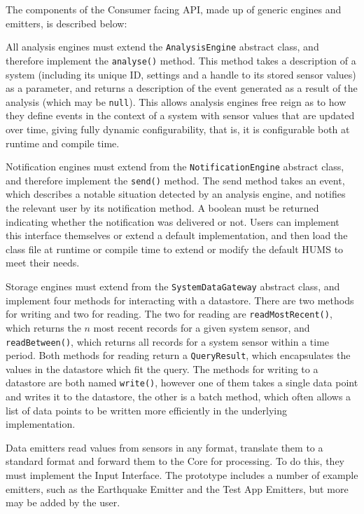 \documentclass[10pt,a4paper]{article}
\begin{document}
The components of the Consumer facing API, made up of generic engines and emitters, is described below:
\begin{description} [noitemsep]	
	\item[Analysis Engines] All analysis engines must extend the \texttt{AnalysisEngine} abstract class, and therefore implement the \texttt{analyse()} method. This method takes a description of a system (including its unique ID, settings and a handle to its stored sensor values) as a parameter, and returns a description of the event generated as a result of the analysis (which may be \texttt{null}). This allows analysis engines free reign as to how they define events in the context of a system with sensor values that are updated over time, giving fully dynamic configurability, that is, it is configurable both at runtime and compile time.
	\item[Notification Engines] Notification engines must extend from the \texttt{NotificationEngine} abstract class, and therefore implement the \texttt{send()} method. The send method takes an event, which describes a notable situation detected by an analysis engine, and notifies the relevant user by its notification method. A boolean must be returned indicating whether the notification was delivered or not. Users can implement this interface themselves or extend a default implementation, and then load the class file at runtime or compile time to extend or modify the default HUMS to meet their needs.
	\item[Storage Engines] Storage engines must extend from the \texttt{SystemDataGateway} abstract class, and implement four methods for interacting with a datastore. There are two methods for writing and two for reading. The two for reading are \texttt{readMostRecent()}, which returns the $n$ most recent records for a given system sensor, and \texttt{readBetween()}, which returns all records for a system sensor within a time period. Both methods for reading return a \texttt{QueryResult}, which encapsulates the values in the datastore which fit the query. The methods for writing to a datastore are both named \texttt{write()}, however one of them takes a single data point and writes it to the datastore, the other is a batch method, which often allows a list of data points to be written more efficiently in the underlying implementation.
	\item[Data Emitters] Data emitters read values from sensors in any format, translate them to a standard format and forward them to the Core for processing. To do this, they must implement the Input Interface. The prototype includes a number of example emitters, such as the Earthquake Emitter and the Test App Emitters, but more may be added by the user.
\end{description}
\end{document}
